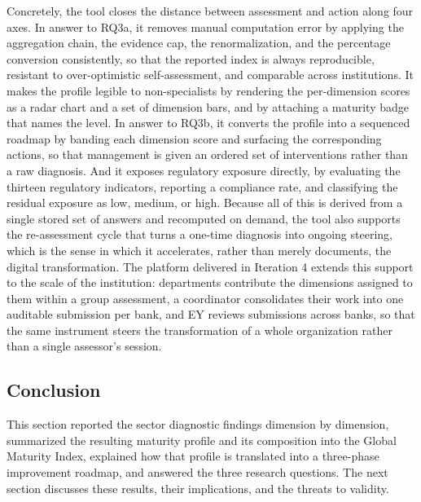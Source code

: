 Concretely, the tool closes the distance between assessment and action along four axes. In answer to RQ3a, it removes manual computation error by applying the aggregation chain, the evidence cap, the renormalization, and the percentage conversion consistently, so that the reported index is always reproducible, resistant to over-optimistic self-assessment, and comparable across institutions. It makes the profile legible to non-specialists by rendering the per-dimension scores as a radar chart and a set of dimension bars, and by attaching a maturity badge that names the level. In answer to RQ3b, it converts the profile into a sequenced roadmap by banding each dimension score and surfacing the corresponding actions, so that management is given an ordered set of interventions rather than a raw diagnosis. And it exposes regulatory exposure directly, by evaluating the thirteen regulatory indicators, reporting a compliance rate, and classifying the residual exposure as low, medium, or high. Because all of this is derived from a single stored set of answers and recomputed on demand, the tool also supports the re-assessment cycle that turns a one-time diagnosis into ongoing steering, which is the sense in which it accelerates, rather than merely documents, the digital transformation. The platform delivered in Iteration 4 extends this support to the scale of the institution: departments contribute the dimensions assigned to them within a group assessment, a coordinator consolidates their work into one auditable submission per bank, and EY reviews submissions across banks, so that the same instrument steers the transformation of a whole organization rather than a single assessor's session.

\subsection{Conclusion}

This section reported the sector diagnostic findings dimension by dimension, summarized the resulting maturity profile and its composition into the Global Maturity Index, explained how that profile is translated into a three-phase improvement roadmap, and answered the three research questions. The next section discusses these results, their implications, and the threats to validity.
